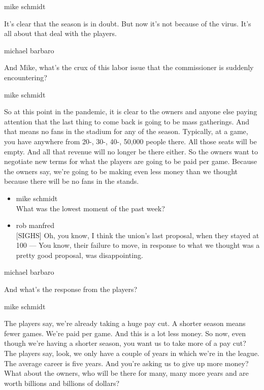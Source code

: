 mike schmidt

It's clear that the season is in doubt. But now it's not because of the
virus. It's all about that deal with the players.

michael barbaro

And Mike, what's the crux of this labor issue that the commissioner is
suddenly encountering?

mike schmidt

So at this point in the pandemic, it is clear to the owners and anyone
else paying attention that the last thing to come back is going to be
mass gatherings. And that means no fans in the stadium for any of the
season. Typically, at a game, you have anywhere from 20-, 30-, 40-,
50,000 people there. All those seats will be empty. And all that revenue
will no longer be there either. So the owners want to negotiate new
terms for what the players are going to be paid per game. Because the
owners say, we're going to be making even less money than we thought
because there will be no fans in the stands.

\begin{itemize}
\item
  mike schmidt\\
  What was the lowest moment of the past week?
\item
  rob manfred\\
  {[}SIGHS{]} Oh, you know, I think the union's last proposal, when they
  stayed at 100 --- You know, their failure to move, in response to what
  we thought was a pretty good proposal, was disappointing.
\end{itemize}

michael barbaro

And what's the response from the players?

mike schmidt

The players say, we're already taking a huge pay cut. A shorter season
means fewer games. We're paid per game. And this is a lot less money. So
now, even though we're having a shorter season, you want us to take more
of a pay cut? The players say, look, we only have a couple of years in
which we're in the league. The average career is five years. And you're
asking us to give up more money? What about the owners, who will be
there for many, many more years and are worth billions and billions of
dollars?

